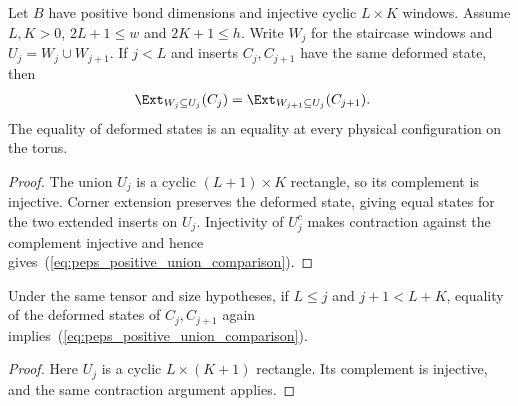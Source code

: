 \begin{lemma}%
    \label{thm:peps_positive_staircase_comparison}
    \leanok
    Let $B$ have positive bond dimensions and injective cyclic
    $L\times K$ windows.
    Assume $L,K>0$, $2L+1\leq w$ and $2K+1\leq h$.
    Write $W_j$ for the staircase windows and $U_j=W_j\cup W_{j+1}$.
    If $j<L$ and inserts $C_j,C_{j+1}$ have the same deformed state,
    then
    \begin{align}
        \Ext_{W_j\subseteq U_j}(C_j)
         & =\Ext_{W_{j+1}\subseteq U_j}(C_{j+1}).
        \label{eq:peps_positive_union_comparison}
    \end{align}
    The equality of deformed states is an equality at every physical
    configuration on the torus.
\end{lemma}
\begin{proof}\leanok
    The union $U_j$ is a cyclic $(L+1)\times K$ rectangle, so its
    complement is injective. Corner extension preserves the deformed
    state, giving equal states for the two extended inserts on $U_j$.
    Injectivity of $U_j^c$ makes contraction against the complement
    injective and hence gives~(\ref{eq:peps_positive_union_comparison}).
\end{proof}

\begin{lemma}%
    \label{thm:peps_positive_vertical_staircase_comparison}
    \leanok
    Under the same tensor and size hypotheses, if $L\leq j$ and
    $j+1<L+K$, equality of the deformed states of $C_j,C_{j+1}$
    again implies~(\ref{eq:peps_positive_union_comparison}).
\end{lemma}
\begin{proof}\leanok
    Here $U_j$ is a cyclic $L\times(K+1)$ rectangle. Its complement
    is injective, and the same contraction argument applies.
\end{proof}

